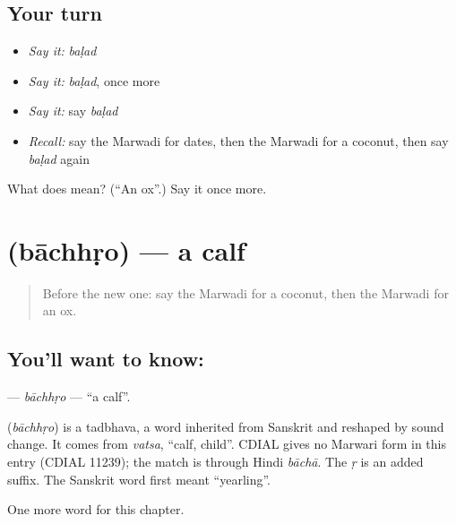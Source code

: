 \subsection*{Your turn}
\begin{itemize}
\raggedright
  \item \emph{Say it:} \emph{baḷad}
  \item \emph{Say it:} \emph{baḷad}, once more
  \item \emph{Say it:} say \emph{baḷad}
  \item \emph{Recall:} say the Marwadi for dates, then the Marwadi for a coconut, then say \emph{baḷad} again
\end{itemize}

\begin{tcolorbox}[breakable,colback=teal!4,colframe=teal!35!black,title={Before you move on}]
What does  mean? (\textquotedblleft{}An ox\textquotedblright{}.) Say it once more.
\end{tcolorbox}
\section[\texorpdfstring{\mw{बाछड़ो} (bāchhṛo)}{बाछड़ो (bāchhṛo)}]{ (bāchhṛo) — a calf}

\label{lesson:MW-C138-bachhro}



\begin{quote}
Before the new one: say the Marwadi for a coconut, then the Marwadi for an ox.
\end{quote}

\subsection*{You'll want to know: }
\textbf{} — \emph{bāchhṛo} — \textquotedblleft{}a calf\textquotedblright{}.

\begin{cousinweb}
\textbf{} (\emph{bāchhṛo}) is a tadbhava, a word inherited from Sanskrit and reshaped by sound change. It comes from \emph{vatsa}, \textquotedblleft{}calf, child\textquotedblright{}. CDIAL gives no Marwari form in this entry (CDIAL 11239); the match is through Hindi \emph{bāchā}. The \emph{ṛ} is an added suffix. The Sanskrit word first meant \textquotedblleft{}yearling\textquotedblright{}.
\end{cousinweb}

\begin{grammarlens}[title={What you've built}]
One more word for this chapter.
\end{grammarlens}

